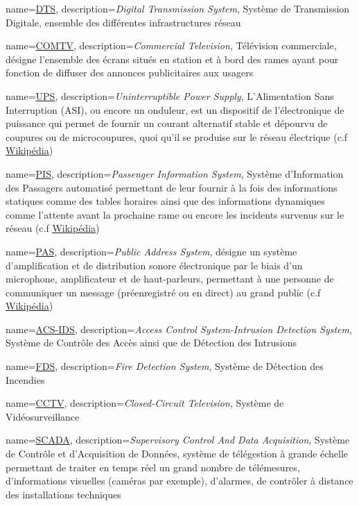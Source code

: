 {
	name=\underline{DTS},
	description={\textit{Digital Transmission System}, Système de Transmission Digitale, ensemble des différentes infrastructures réseau}
}

{
	name=\underline{COMTV},
	description={\textit{Commercial Television}, Télévision commerciale, désigne l'ensemble des écrans situés en station et à bord des rames ayant pour fonction de diffuser des annonces publicitaires aux usagers}
}

{
	name=\underline{UPS},
	description={\textit{Uninterruptible Power Supply}, L'Alimentation Sans Interruption (ASI), ou encore un onduleur, est un dispositif de l'électronique de puissance qui permet de fournir un courant alternatif stable et dépourvu de coupures ou de microcoupures, quoi qu'il se produise sur le réseau électrique (c.f \underline{\href{https://fr.wikipedia.org/wiki/Alimentation_sans_interruption}{Wikipédia}})}
}


{
	name=\underline{PIS},
	description={\textit{Passenger Information System}, Système d'Information des Passagers automatisé permettant de leur fournir à la fois des informations statiques comme des tables horaires ainsi que des informations dynamiques comme l'attente avant la prochaine rame ou encore les incidents survenus sur le réseau (c.f \underline{\href{https://en.wikipedia.org/wiki/Passenger_information_system}{Wikipédia}})}
}

{
	name=\underline{PAS},
	description={\textit{Public Address System}, désigne un système d'amplification et de distribution sonore électronique par le biais d'un microphone, amplificateur et de haut-parleurs, permettant à une personne de communiquer un message (préenregistré ou en direct) au grand public (c.f \underline{\href{https://en.wikipedia.org/wiki/Public_address_system}{Wikipédia}})}
}

{
	name=\underline{ACS-IDS},
	description={\textit{Access Control System-Intrusion Detection System}, Système de Contrôle des Accès ainsi que de Détection des Intrusions}
}

{
	name=\underline{FDS},
	description={\textit{Fire Detection System}, Système de Détection des Incendies}
}

{
	name=\underline{CCTV},
	description={\textit{Closed-Circuit Television}, Système de Vidéosurveillance}
}

{
	name=\underline{SCADA},
	description={\textit{Supervisory Control And Data Acquisition}, Système de Contrôle et d'Acquisition de Données, système de télégestion à grande échelle permettant de traiter en temps réel un grand nombre de télémesures, d'informations visuelles (caméras par exemple), d'alarmes, de contrôler à distance des installations techniques}
}


